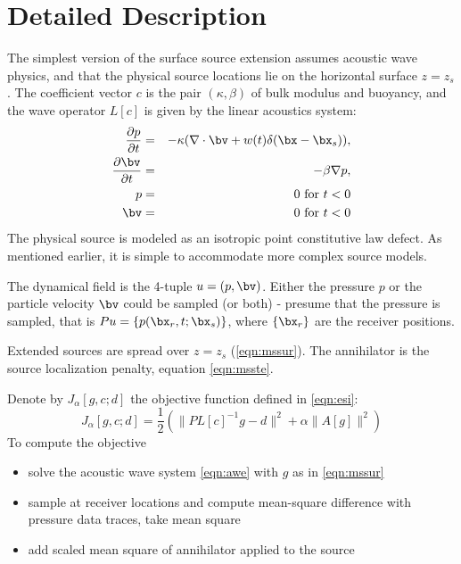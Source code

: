 \section{Detailed Description}
The simplest version of the surface source extension assumes acoustic wave physics, and that the physical source locations lie on the horizontal surface $z=z_s$. The coefficient vector $c$ is the pair $(\kappa,\beta)$ of bulk modulus and buoyancy, and the wave operator $L[c]$ is given by the linear acoustics system:
\begin{eqnarray}
\label{eqn:awe}
\frac{\partial p}{\partial t} & = & - \kappa (\nabla \cdot \bv +
w(t)\delta(\bx-\bx_s)), \nonumber \\
\frac{\partial \bv}{\partial t} & = & - \beta \nabla p,\nonumber \\
p & =& 0 \mbox{ for } t<0\nonumber\\ 
\bv & = & 0 \mbox{ for } t<0 
\end{eqnarray}
The physical source is modeled as an isotropic point constitutive law defect. As mentioned earlier, it is simple to accommodate more complex source models.

The dynamical field is the 4-tuple $u=(p,\bv)$. Either the pressure $p$ or the particle velocity $\bv$ could be sampled (or both) - presume that the pressure is sampled, that is $Pu = \{p(\bx_r,t;\bx_s)\}$, where $\{\bx_r\}$ are the receiver positions. 

Extended sources are spread over $z=z_s$ (\ref{eqn:mssur}). The annihilator is the source localization penalty, equation \ref{eqn:msste}.

Denote by $J_{\alpha}[g,c;d]$ the objective function defined in \ref{eqn:esi}:
\begin{equation}
\label{eqn:jdef}
J_{\alpha}[g,c;d] = \frac{1}{2}( \|PL[c]^{-1}g -d \|^2 + \alpha \|A[g]\|^2) 
\end{equation}
To compute the objective 
\begin{itemize}
\item solve the acoustic wave system \ref{eqn:awe} with $g$ as in \ref{eqn:mssur}
\item sample at receiver locations and compute mean-square difference with pressure data traces, take mean square
\item add scaled mean square of annihilator applied to the source
\end{itemize}

